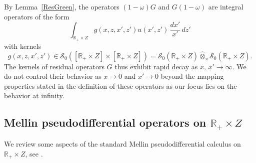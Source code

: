 \documentclass[reqno]{amsart}
\numberwithin{equation}{section}
\theoremstyle{definition}
\def\R{\mathbb R}
\def\S{\mathscr S}
\begin{document}
\noindent
By Lemma~\ref{ResGreen}, the operators $(1-\omega)G$ and $G(1-\omega)$ are integral operators of the form
$$
\int_{\R_+\times Z} g(x,z,x',z')u(x',z')\,\frac{dx'}{x'}\,dz'
$$
with kernels
$$
g(x,z,x',z') \in \S_0([\R_+\times Z] \times [\R_+\times Z]) = \S_0(\R_+\times Z) \hat{\otimes}_{\pi} \S_0(\R_+\times Z).
$$
The kernels of residual operators $G$ thus exhibit rapid decay as $x,\,x' \to \infty$. We do not control their behavior as $x \to 0$ and $x' \to 0$ beyond the mapping properties stated in the definition of these operators as our focus lies on the behavior at infinity.

\subsection{Mellin pseudodifferential operators on {\boldmath $\R_+\times Z$}}\label{sec-MellinCalcReview}

We review some aspects of the standard Mellin pseudodifferential calculus on $\R_+\times Z$, see \cite{GilSchulzeSeiler0,GilSchulzeSeiler,KrainerMellin,SchuNH}.
\end{document}
